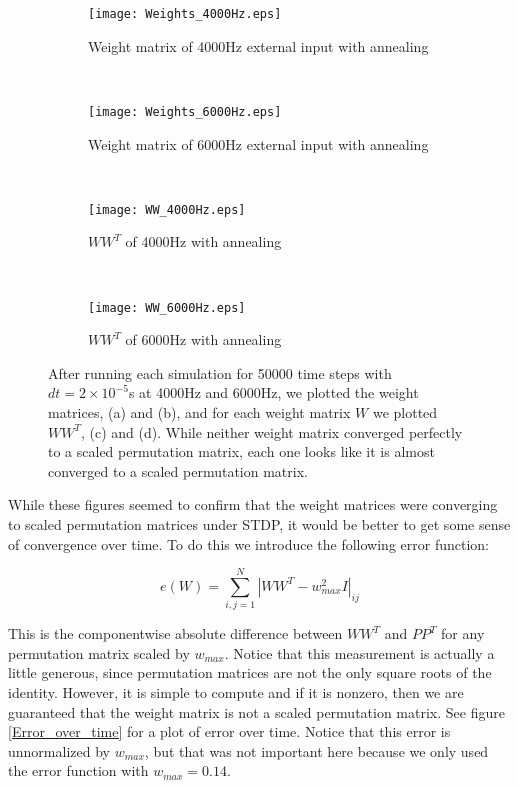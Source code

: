 \begin{figure}[H]
\centering
\begin{subfigure}[b]{0.49\textwidth}
\texttt{[image: Weights\_4000Hz.eps]}
\caption{Weight matrix of 4000Hz external input with annealing}
\label{Weights: 4000Hz, basic}
\end{subfigure}
\,
\begin{subfigure}[b]{0.49\textwidth}
\texttt{[image: Weights\_6000Hz.eps]}
\caption{Weight matrix of 6000Hz external input with annealing}
\label{Weights: 6000Hz, basic}
\end{subfigure}
\\
\begin{subfigure}[b]{0.49\textwidth}
\texttt{[image: WW\_4000Hz.eps]}
\caption{\(WW^T\) of 4000Hz with annealing}
\label{Weights: 4000Hz, product}
\end{subfigure}
\,
\begin{subfigure}[b]{0.49\textwidth}
\texttt{[image: WW\_6000Hz.eps]}
\caption{\(WW^T\) of 6000Hz with annealing}
\label{Weights: 6000Hz, product}
\end{subfigure}
\caption{After running each simulation for 50000 time steps with \(dt = 2\times 10^{-5}\)s at 4000Hz and 6000Hz, we plotted the weight matrices, (a) and (b), and for each weight matrix \(W\) we plotted \(WW^T\), (c) and (d). While neither weight matrix converged perfectly to a scaled permutation matrix, each one looks like it is almost converged to a scaled permutation matrix.}
\label{Weights}
\end{figure}

While these figures seemed to confirm that the weight matrices were converging to scaled permutation matrices under STDP, it would be better to get some sense of convergence over time. To do this we introduce the following error function:

\[e(W) = \sum_{i,j=1}^N \left|WW^T - w_{max}^2I\right|_{ij}\]

This is the componentwise absolute difference between \(WW^T\) and \(PP^T\) for any permutation matrix scaled by \(w_{max}\). Notice that this measurement is actually a little generous, since permutation matrices are not the only square roots of the identity. However, it is simple to compute and if it is nonzero, then we are guaranteed that the weight matrix is not a scaled permutation matrix. See figure \ref{Error_over_time} for a plot of error over time. Notice that this error is unnormalized by \(w_{max}\), but that was not important here because we only used the error function with \(w_{max} = 0.14\).

